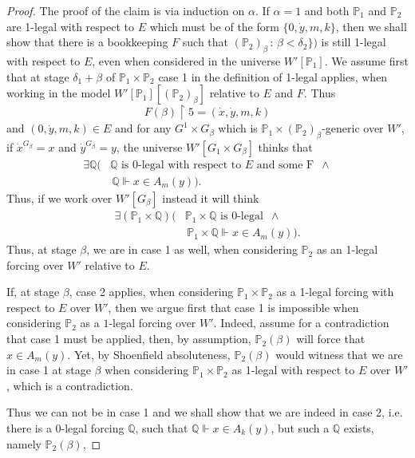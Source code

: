 \documentclass[a4paper,11pt]{article}
\newcommand{\forceP}{\mathbb{P}}
\newcommand{\forceQ}{\mathbb{Q}}
\begin{document}
\begin{proof}
\medskip

The proof of the claim is via induction on $\alpha$.
If $\alpha=1$ and both $\forceP_1$ and $\forceP_2$ are 1-legal with respect to $E$ which must be of the form $ \{0,\dot{y},m,k\}$, then we shall show that there is a bookkeeping $F$ such that $(\forceP_2)_{\beta}\, : \, \beta < \delta_2\})$ is still 1-legal with respect to $E$, even when considered in the universe $W'[\forceP_1]$.
We assume first that at stage $\delta_1+\beta$ of $\forceP_1 \times \forceP_2$  case 1 in the definition of 1-legal applies, when working in the model $W'[\forceP_1][(\forceP_2)_{\beta}]$ relative to $E$ and $F$. Thus
\[ F(\beta) \upharpoonright 5= (\dot{x},\dot{y},m,k) \]
and $(0,\dot{y},m,k) \in E$ and for any $G^1 \times G_{\beta}$ which is $\forceP_1 \times (\forceP_2)_{\beta}$-generic over $W'$, if $\dot{x}^{G_{\beta}}=x$ and $\dot{y}^{G_{\beta}}=y$, the universe $W'[G_1 \times G_{\beta}]$ thinks that
\begin{align*}
\exists \forceQ (&\forceQ \text{ is } 0 \text{-legal with respect to } E \text{ and some F }\,  \land \\& \, \forceQ \Vdash {x} \in A_m({y})).
\end{align*}
Thus, if we work over $W'[G_{\beta}]$ instead it will think
\begin{align*}
\exists (\forceP_1 \times \forceQ) (&\forceP_1 \times \forceQ \text{ is } 0 \text{-legal } \,  \land \\&  \, \forceP_1 \times \forceQ \Vdash {x} \in A_m({y})).
\end{align*}
Thus, at stage $\beta$, we are in case 1 as well, when considering $\forceP_2$ as an 1-legal forcing over $W'$ relative to $E$.

If, at stage $\beta$, case 2 applies, when considering $\forceP_1 \times \forceP_2$ as a 1-legal forcing with respect to $E$ over $W'$, then we argue first that case 1 is impossible when considering $\forceP_2$ as a $1$-legal forcing over $W'$.
Indeed, assume for a contradiction that case 1 must be applied, then, by assumption,
$\forceP_2(\beta)$ will force that $x \in A_m(y)$. Yet, by Shoenfield absoluteness, $\forceP_2(\beta)$ would witness that we are in case 1 at stage $\beta$ when considering $\forceP_1 \times\forceP_2$ as 1-legal with respect to $E$ over $W'$, which is a contradiction.

Thus we can not be in case 1 and we shall show that we are indeed in case 2, i.e. there is a 0-legal forcing $\forceQ$, such that $\forceQ \Vdash x \in A_k(y)$, but such a $\forceQ$ exists, namely $\forceP_2(\beta)$, 


\end{proof}
\end{document}
